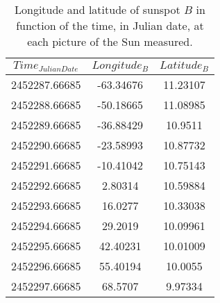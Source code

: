 \begin{table}[H]
	\centering
	\begin{tabular}{ c  c  c }
		\\\hline
		\centering
			$Time_{Julian Date}$ & $Longitude_{B}$ & $Latitude_{B}$ \\\hline
			2452287.66685 & -63.34676 & 11.23107 \\
			2452288.66685 & -50.18665 & 11.08985 \\
			2452289.66685 & -36.88429 & 10.9511 \\
			2452290.66685 & -23.58993 & 10.87732 \\
			2452291.66685 & -10.41042 & 10.75143 \\
			2452292.66685 & 2.80314 & 10.59884 \\
			2452293.66685 & 16.0277 & 10.33038 \\
			2452294.66685 & 29.2019 & 10.09961 \\
			2452295.66685 & 42.40231 & 10.01009 \\
			2452296.66685 & 55.40194 & 10.0055 \\
			2452297.66685 & 68.5707 & 9.97334 \\\hline
	\end{tabular}
	\caption{\label{Tab:sunspotB}Longitude and latitude of sunspot $B$ in function of the time, in Julian date, at each picture of the Sun measured.}
\end{table}
